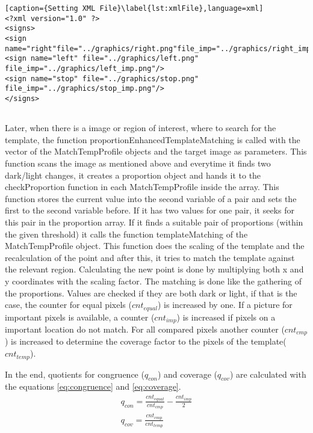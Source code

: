 \begin{lstlisting}[caption={Setting XML File}\label{lst:xmlFile},language=xml]
<?xml version="1.0" ?>
<signs>
<sign name="right"file="../graphics/right.png"file_imp="../graphics/right_imp.png"/>
<sign name="left" file="../graphics/left.png" file_imp="../graphics/left_imp.png"/>
<sign name="stop" file="../graphics/stop.png" file_imp="../graphics/stop_imp.png"/>
</signs>
  
\end{lstlisting}

Later, when there is a image or region of interest, where to search for the template, the function
proportionEnhancedTemplateMatching is called with the vector of the MatchTempProfile objects and the target 
image as parameters. This function scans the image as mentioned above and everytime it finds two dark/light 
changes, it creates a proportion object and hands it to the checkProportion function in each MatchTempProfile inside 
the array. This function stores the current value into the second variable of a pair and sets the first to
the second variable before. If it has two values for one pair, it seeks  
for this pair in the proportion array. If it finds a suitable pair of proportions (within the given threshold) 
it calls the function templateMatching of the MatchTempProfile object.
This function does the scaling of the template and the recalculation of the point and after this,
it tries to match the template against the relevant region. Calculating the new point is
done by multiplying both x and y coordinates with the scaling factor. The matching is done like
the gathering of the proportions. Values are checked if they are both dark or light, if that
is the case, the counter for equal pixels ($cnt_{equal}$) is increased by one. If a picture for important pixels
is available, a counter ($cnt_{imp}$) is increased if pixels on a important location do not match. For all compared
pixels another counter ($cnt_{cmp}$) is increased to determine the coverage factor to the pixels of the template($cnt_{temp}$).

In the end, quotients for  congruence ($q_{con}$) and coverage ($q_{cov}$) are calculated with the equations
\ref{eq:congruence} and \vref{eq:coverage}.
\begin{gather}
	q_{con} =\frac{cnt_{equal}}{cnt_{cmp}}-\frac{cnt_{imp}}{2} \label{eq:congruence}\\
	q_{cov} = \frac{cnt_{cmp}}{cnt_{temp}}\label{eq:coverage}
\end{gather}


